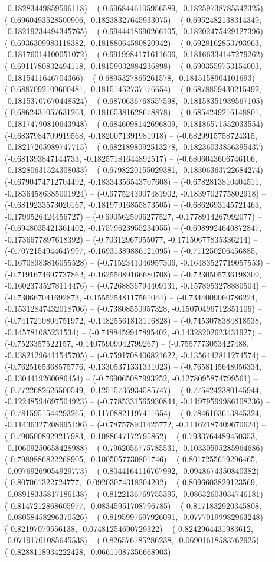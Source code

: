 -0.18283449859596118) -- (-0.6968446105956589, -0.18259738785342325) -- (-0.6960493528500906, -0.18238327645933075) -- (-0.6952482138314349, -0.18219234494345765) -- (-0.6944418690266105, -0.18202475429127396) -- (-0.6936309983118382, -0.18188064580820942) -- (-0.6928162853793963, -0.18176014100051072) -- (-0.6919984171611606, -0.18166334147279262) -- (-0.6911780832494118, -0.18159032884236898) -- (-0.6903559753154003, -0.1815411646704366) -- (-0.6895327865261578, -0.1815158904101693) -- (-0.6887092109600481, -0.18151452737176654) -- (-0.6878859430215492, -0.18153707670448524) -- (-0.6870636768557598, -0.18158351939567105) -- (-0.6862431057631263, -0.18165381628678878) -- (-0.6854249216148801, -0.18174790810643948) -- (-0.6846098142696809, -0.18186571552033554) -- (-0.6837984709919568, -0.1820071391981918) -- (-0.6829915758724315, -0.18217205989747715) -- (-0.6821898092513278, -0.18236033856395437) -- (-0.681393847144733, -0.18257181644892517) -- (-0.6806043606746106, -0.18280631524308033) -- (-0.6798220155029381, -0.18306363722684274) -- (-0.6790474712704492, -0.18334356543707608) -- (-0.6782813810404511, -0.18364586385001924) -- (-0.6775243907481902, -0.1839702775802918) -- (-0.6819233573020167, -0.18197916855873505) -- (-0.6862693145721463, -0.1799526424456727) -- (-0.6905625996277527, -0.1778914267992077) -- (-0.6948035421361402, -0.17579623955234955) -- (-0.6989924640872847, -0.1736677897618392) -- (-0.70312967955077, -0.17150677835336214) -- (-0.7072154944647997, -0.16931389886121095) -- (-0.711250206456885, -0.16708983816055528) -- (-0.7152341046957306, -0.16483527719057553) -- (-0.7191674697737862, -0.16255089166680708) -- (-0.7230505736198309, -0.16023735278114476) -- (-0.7268836794409131, -0.1578953278880504) -- (-0.730667041692873, -0.15552548117561044) -- (-0.7344009060786224, -0.15312847432018706) -- (-0.73808550957328, -0.15070496712351106) -- (-0.7417210804751972, -0.14825561813116828) -- (-0.7453078384818538, -0.145781085231534) -- (-0.7488459947895402, -0.14328202623431927) -- (-0.7523357522157, -0.14075909942799267) -- (-0.7557773053427488, -0.13821296411545705) -- (-0.7591708406821622, -0.1356442811274574) -- (-0.7625165368575776, -0.13305371331331023) -- (-0.7658145648056334, -0.1304419260086454) -- (-0.769065087993252, -0.1278095874799561) -- (-0.7722682626500549, -0.12515736934585747) -- (-0.7754242380145944, -0.12248594697504923) -- (-0.7785331565930844, -0.11979599986108236) -- (-0.7815951544293265, -0.11708821197411654) -- (-0.7846103613845324, -0.11436327208995196) -- (-0.787578901425772, -0.11162187409670624) -- (-0.7905008929217983, -0.1088647172795862) -- (-0.7933764489450353, -0.10609250658428988) -- (-0.7962056775785531, -0.10330595285964686) -- (-0.7989886822268905, -0.1005057730801746) -- (-0.8017255619296465, -0.09769269054929773) -- (-0.8044164116767992, -0.0948674350840382) -- (-0.807061322724777, -0.09203074318204202) -- (-0.8096603829123569, -0.08918335817186138) -- (-0.8122136769755395, -0.08632603034746181) -- (-0.8147212868605977, -0.08345951708796785) -- (-0.8171832920345808, -0.08058458296370526) -- (-0.8195997697926091, -0.07770199982963248) -- (-0.82197079556138, -0.07481254690729322) -- (-0.8242964431983612, -0.07191701085645538) -- (-0.826576785286238, -0.06901618583762925) -- (-0.8288118934222428, -0.06611087356668903) -- 